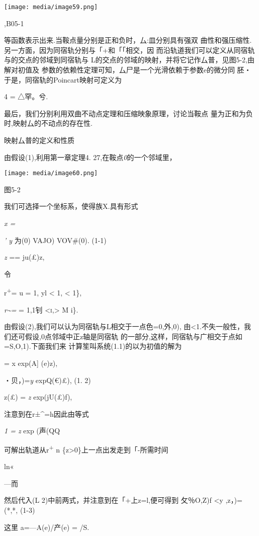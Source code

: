 \documentclass{article}
\begin{document}
\texttt{[image: media/image59.png]}

,B05-1

等函数表示出来.当鞍点量分别是正和负时，厶:皿分别具有强双
曲性和强压缩性.另一方面，因为同宿轨分别与「+和「「相交，因
而沿轨道我们可以定义从同宿轨与的交点的邻域到同宿轨与
L的交点的邻域的映射，并将它记作厶普，见图5-2,由解对初值及
参数的依赖性定理可知，厶尸是一个光滑依赖于参数e的微分同
胚・于是，同宿轨的Poincart映射可定义为

4 = △罕。兮.

最后，我们分别利用双曲不动点定理和压缩映象原理，讨论当鞍点
量为正和为负时,映射厶的不动点的存在性.

映射厶普的定义和性质

由假设(1),利用第一章定理4. 27,在鞍点\emph{0}的一个邻域里，

\texttt{[image: media/image60.png]}

图5-2

我们可选择一个坐标系，使得族X.具有形式

\emph{x =}

\emph{' y} 为(0) VAJO) VOV\#(0). (1-1)

\emph{z} == ju(£)z,

令

r\textsuperscript{+}= u = 1, \textbar{}yl \textless{} 1, \textless{}
1\},

\emph{r\textasciitilde{}=} = 1,1钊
\textsc{\textless{}i,}\textbar{}\textgreater{}\textbar{} M i\}.

由假设(2),我们可以认为同宿轨与L相交于一点色=0,外,0),
\textbar{}由\textless{}1.不失一般性，我们还可假设,0点邻域中正z轴是同宿轨
的一部分,这样，同宿轨与广相交于点如=S,O,1).下面我们来
计算笙叫系统(1.1)的以为初值的解为

= x exp(A{]} (e)z),

・贝，)=\emph{y} expQ(€)£), (1. 2)

z(£) = \emph{z} exp(jU(£)f),

注意到在r±\^{}=h因此由等式

\emph{1 = z} exp (声(QQ

可解出轨道从r\textsuperscript{+} n
\{z\textgreater{}0\}上一点出发走到「-所需时间

ln«

---而

然后代入(L 2)中前两式，并注意到在「+上z=l,便可得到 攵％O,Z)f
\textless{}y ,z，)= (*,*, (1-3)

这里 a=---A(e)/产(e) = /S.
\end{document}
